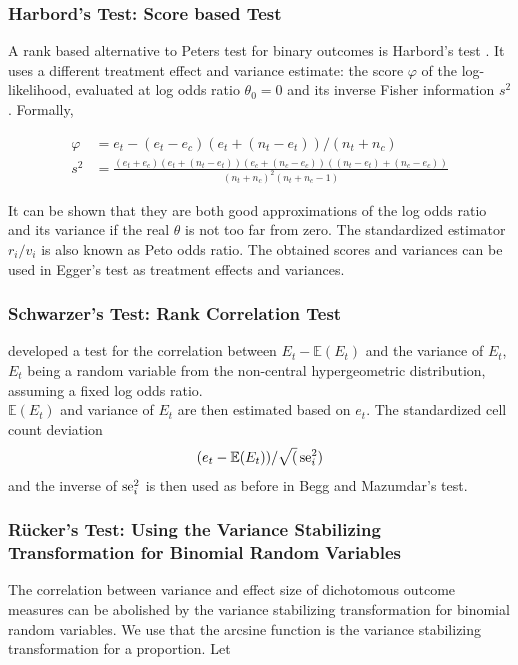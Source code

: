 \documentclass[11pt,a4paper,twoside]{book}\usepackage[]{graphicx}\usepackage[]{color}
\begin{document}
\subsubsection{Harbord's Test: Score based Test} \label{sec:Harbord}
A rank based alternative to Peters test for binary outcomes is Harbord's test \citep{Harbord}.
It uses a different treatment effect and variance estimate: the score $\varphi$ of the log-likelihood, evaluated at log odds ratio $\theta_0 = 0$ and its inverse Fisher information $s^2$. Formally,

\begin{align}
\varphi &= e_t - (e_t - e_c)(e_t + (n_t - e_t))/(n_t + n_c) \label{harbord.score} \\
 s^2 &= \frac{(e_t + e_c)(e_t + (n_t - e_t))(e_c + (n_c - e_c))((n_t - e_t) + (n_c - e_c))}{(n_t + n_c)^2(n_t + n_c - 1)} \label{harbord.variance}
\end{align}

It can be shown that they are both good approximations of the log odds ratio and its variance if the real $\theta$ is not too far from zero. The standardized estimator $r_i/v_i$ is also known as Peto odds ratio. The obtained scores and variances can be used in Egger's test as treatment effects and variances.


\subsubsection{Schwarzer's Test: Rank Correlation Test} \label{sec:Schwarzer}
\citet{Schwarzer} developed a test for the correlation between $E_t - \mathbb{E}(E_t)$ and the variance of $E_t$, $E_t$ being a random variable from the non-central hypergeometric distribution, assuming a fixed log odds ratio. \\
$\mathbb{E}(E_t)$ and variance of $E_t$ are then estimated based on $e_t$. The standardized cell count deviation 
\begin{align}
(e_t - \mathbb{E}(E_t))/\sqrt(\operatorname{se}_i^2)
\end{align}
and the inverse of $\operatorname{se}_i^2$ is then used as before in Begg and Mazumdar's test.

\subsubsection{R\"ucker's Test: Using the Variance Stabilizing Transformation for Binomial Random Variables} \label{sec:Rucker}
The correlation between variance and effect size of dichotomous outcome measures can be abolished by the variance stabilizing transformation for binomial random variables. We use that the arcsine function is the variance stabilizing transformation for a proportion. Let
\end{document}
